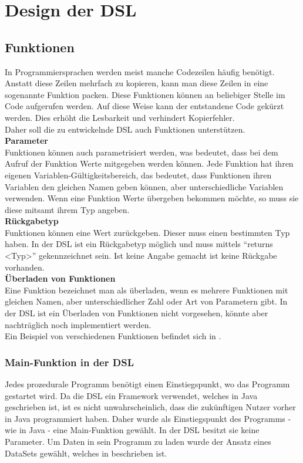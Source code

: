 
\chapter{Design der DSL}

\section{Funktionen}
In Programmiersprachen werden meist manche Codezeilen häufig benötigt.
Anstatt diese Zeilen mehrfach zu kopieren, kann man diese Zeilen in eine sogenannte Funktion packen.
Diese Funktionen können an beliebiger Stelle im Code aufgerufen werden.
Auf diese Weise kann der entstandene Code gekürzt werden.
Dies erhöht die Lesbarkeit und verhindert Kopierfehler.\\
Daher soll die zu entwickelnde \ac{DSL} auch Funktionen unterstützen.\\
\textbf{Parameter}\\
Funktionen können auch parametrisiert werden, was bedeutet, dass bei dem Aufruf der Funktion Werte mitgegeben werden können.
Jede Funktion hat ihren eigenen Variablen-Gültigkeitsbereich, das bedeutet, dass Funktionen ihren Variablen den gleichen Namen geben können, aber unterschiedliche Variablen verwenden.
Wenn eine Funktion Werte übergeben bekommen möchte, so muss sie diese mitsamt ihrem Typ angeben.\\
\textbf{Rückgabetyp}\\
Funktionen können eine Wert zurückgeben.
Dieser muss einen bestimmten Typ haben.
In der DSL ist ein Rückgabetyp möglich und muss mittels ``returns <Typ>'' gekennzeichnet sein.
Ist keine Angabe gemacht ist keine Rückgabe vorhanden.\\
\textbf{Überladen von Funktionen}\\
Eine Funktion bezeichnet man als überladen, wenn es mehrere Funktionen mit gleichen Namen, aber unterschiedlicher Zahl oder Art von Parametern gibt.
In der DSL ist ein Überladen von Funktionen nicht vorgesehen, könnte aber nachträglich noch implementiert werden.\\
Ein Beispiel von verschiedenen Funktionen befindet sich in .\\

\subsection{Main-Funktion in der \acs{DSL}}
Jedes prozedurale Programm benötigt einen Einstiegspunkt, wo das Programm gestartet wird.
Da die DSL ein Framework verwendet, welches in Java geschrieben ist, ist es nicht unwahrscheinlich, dass die zukünftigen Nutzer vorher in Java programmiert haben.
Daher wurde als Einstiegspunkt des Programms - wie in Java - eine Main-Funktion gewählt.
In der DSL besitzt sie keine Parameter.
Um Daten in sein Programm zu laden wurde der Ansatz eines DataSets gewählt, welches in  beschrieben ist.

